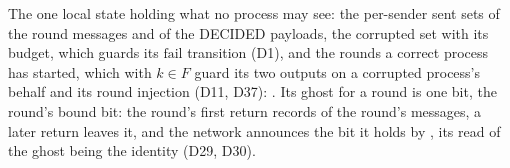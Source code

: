 \begin{definition}
  \label{def:aba-network}
  \leanok
  The one local state holding what no process may see: the per-sender sent sets of the round messages and of the DECIDED payloads, the corrupted set with its budget, which guards its $\mathrm{fail}$ transition (D1), and the rounds a correct process has started, which with $k \in F$ guard its two outputs on a corrupted process's behalf and its round injection (D11, D37): .
  Its ghost for a round is one bit, the round's bound bit: the round's first return records  of the round's messages, a later return leaves it, and the network announces the bit it holds by , its read of the ghost being the identity (D29, D30).
\end{definition}
